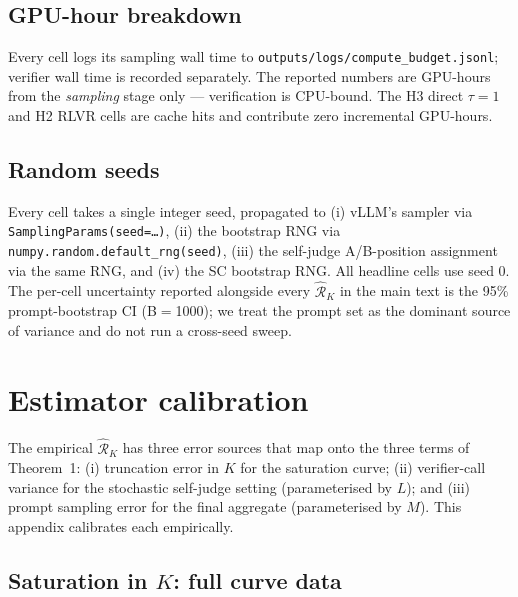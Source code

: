\subsection{GPU-hour breakdown}
\label{app:config:cost}

Every cell logs its sampling wall time to
\texttt{outputs/logs/compute\_budget.jsonl}; verifier wall time is
recorded separately. The reported numbers are GPU-hours from the
\emph{sampling} stage only — verification is CPU-bound. The H3 direct
$\tau{=}1$ and H2 RLVR cells are cache hits and contribute zero
incremental GPU-hours.



\subsection{Random seeds}
\label{app:config:seeds}

Every cell takes a single integer seed, propagated to (i) vLLM's
sampler via \texttt{SamplingParams(seed=\ldots)}, (ii) the bootstrap
RNG via \texttt{numpy.random.default\_rng(seed)}, (iii) the self-judge
A/B-position assignment via the same RNG, and (iv) the SC bootstrap
RNG\@. All headline cells use seed $0$. The per-cell uncertainty
reported alongside every $\hat{\mathcal R}_K$ in the main text is the 95\%
prompt-bootstrap CI (B$=$1000); we treat the prompt set as the
dominant source of variance and do not run a cross-seed sweep.

\section{Estimator calibration}
\label{app:calibration}

The empirical $\hat{\mathcal R}_K$ has three error sources that map onto the three
terms of Theorem~1: (i) truncation error in $K$ for the saturation
curve; (ii) verifier-call variance for the stochastic self-judge
setting (parameterised by $L$); and (iii) prompt sampling error for the
final aggregate (parameterised by $M$). This appendix calibrates each
empirically.

\subsection{Saturation in \texorpdfstring{$K$}{K}: full curve data}
\label{app:calibration:K}

